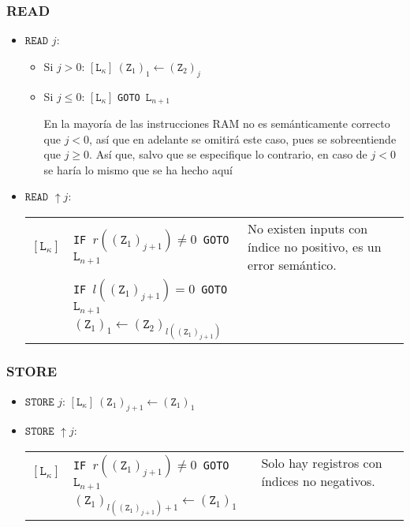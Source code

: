 \documentclass[twoside]{article}
\begin{document}
\subsubsection{READ}
\begin{itemize}
\item $\texttt{READ }j$:
\begin{itemize}
\item Si $j> 0$:
$[\texttt{L}_\kappa]\ (\texttt{Z}_1)_1\leftarrow(\texttt{Z}_2)_j$
\item Si $j\leq 0$:
$[\texttt{L}_\kappa]$ \texttt{GOTO }$\texttt{L}_{n+1}$


En la mayoría de las instrucciones RAM no es semánticamente correcto que $j<0$, así que en adelante se omitirá este caso, pues se sobreentiende que $j\geq 0$. Así que, salvo que se especifique lo contrario, en caso de $j<0$ se haría lo mismo que se ha hecho aquí
\end{itemize}
\item $\texttt{READ }\uparrow j$:

\begin{tabular}{l l l}
$[\texttt{L}_\kappa]$&\texttt{IF }$r((\texttt{Z}_{1})_{j+1})\neq 0$\texttt{ GOTO }$\texttt{L}_{n+1}$ & No existen inputs con índice no positivo, es un error semántico.\\
& \texttt{IF }$l((\texttt{Z}_{1})_{j+1})= 0$\texttt{ GOTO }$\texttt{L}_{n+1}$ &\\
&$(\texttt{Z}_1)_1\leftarrow(\texttt{Z}_2)_{l((\texttt{Z}_{1})_{j+1})}$ &
\end{tabular}
\end{itemize}

\subsubsection{STORE}
\begin{itemize}
\item $\texttt{STORE }j$:
$[\texttt{L}_\kappa]\ (\texttt{Z}_1)_{j+1}\leftarrow(\texttt{Z}_1)_1$
\item $\texttt{STORE }\uparrow j$:

\begin{tabular}{l l l}
$[\texttt{L}_\kappa]$&\texttt{IF }$r((\texttt{Z}_1)_{j+1})\neq 0$\texttt{ GOTO }$\texttt{L}_{n+1}$ & Solo hay registros con índices no negativos.\\
& $(\texttt{Z}_1)_{l((\texttt{Z}_1)_{j+1})+1}\leftarrow(\texttt{Z}_1)_1$ &
\end{tabular}
\end{itemize}
\end{document}
